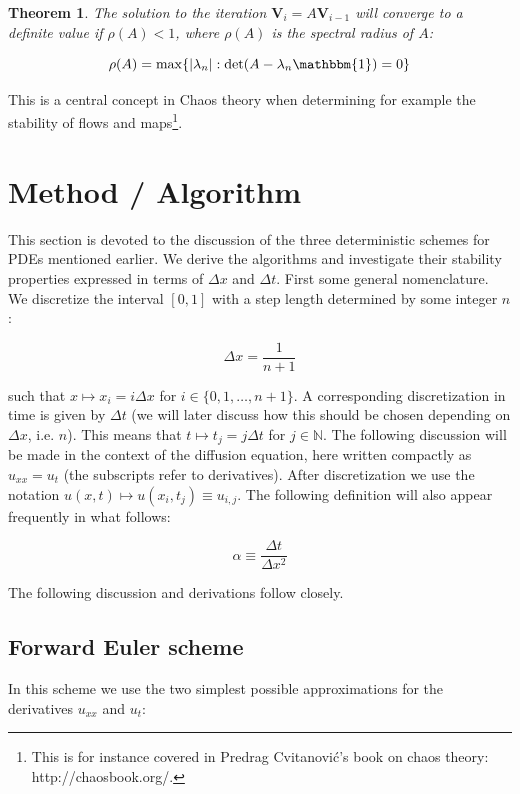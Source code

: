 \documentclass[a4paper, 11pt, notitlepage,english]{article}
\newcommand{\id}{\mathbbm{1}}
\newtheorem{theorem}{Theorem}
\begin{document}
\begin{theorem}
The solution to the iteration $\boldsymbol{V}_i = A \boldsymbol{V}_{i-1}$ will converge to a definite value if $\rho(A) < 1$, where $\rho(A)$ is the spectral radius of $A$:

\begin{equation}
\rho(A) = \mathrm{max}\{\lvert \lambda_n \rvert : \mathrm{det}(A-\lambda_n\id)=0 \}
\label{eq:Spectral_radius}
\end{equation}
\end{theorem}

This is a central concept in Chaos theory when determining for example the stability of flows and maps\footnote{This is for instance covered in Predrag Cvitanović's book on chaos theory: http://chaosbook.org/.}.

\section{Method / Algorithm}
This section is devoted to the discussion of the three deterministic schemes for PDEs mentioned earlier. We derive the algorithms and investigate their stability properties expressed in terms of $\Delta x$ and $\Delta t$. First some general nomenclature. We discretize the interval $[0,1]$ with a step length determined by some integer $n$: 

\begin{equation}
 \Delta x = \frac{1}{n+1}
\label{eq:Step_length}
\end{equation}

such that $x \mapsto x_i = i\Delta x$ for $i \in \{0,1,\dots,n+1 \}$. A corresponding discretization in time is given by $\Delta t$ (we will later discuss how this should be chosen depending on $\Delta x$, i.e. $n$). This means that $t\mapsto t_j = j\Delta t$ for $j\in \mathbb{N}$. The following discussion will be made in the context of the diffusion equation, here written compactly as $u_{xx} = u_t$ (the subscripts refer to derivatives). After discretization we use the notation $u(x,t) \mapsto u(x_i, t_j) \equiv u_{i,j}$. The following definition will also appear frequently in what follows:

\begin{equation}
 \alpha \equiv \frac{\Delta t}{\Delta x^2}
\label{eq:Step_parameter}
\end{equation}

The following discussion and derivations follow \cite{Komp3150} closely.

\subsection{Forward Euler scheme}
In this scheme we use the two simplest possible approximations for the derivatives $u_{xx}$ and $u_t$:
\end{document}
